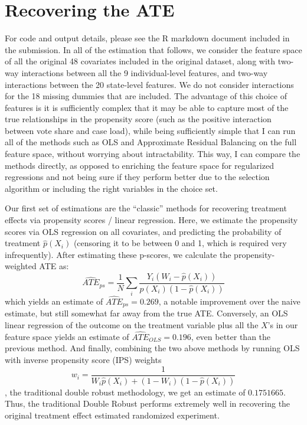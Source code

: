 \documentclass{article}
\begin{document}
\section{Recovering the ATE}
For code and output details, please see the R markdown document included in the submission. In all of the estimation that follows, we consider the feature space of all the original 48 covariates included in the original dataset, along with two-way interactions between all the 9 individual-level features, and two-way interactions between the 20 state-level features. We do not consider interactions for the 18 missing dummies that are included. The advantage of this choice of features is it is sufficiently complex that it may be able to capture most of the true relationships in the propensity score (such as the positive interaction between vote share and case load), while being sufficiently simple that I can run all of the  methods such as OLS and Approximate Residual Balancing on the full feature space, without worrying about intractability. This way, I can compare the methods directly, as opposed to enriching the feature space for regularized regressions and not being sure if they perform better due to the selection algorithm or including the right variables in the choice set.

Our first set of estimations are the ``classic'' methods for recovering treatment effects via propensity scores / linear regression. Here, we estimate the propensity scores via OLS regression on all covariates, and predicting the probability of treatment $\hat p(X_i)$ (censoring it to be between 0 and 1, which is required very infrequently). After estimating these p-scores, we calculate the propensity-weighted ATE as: 
\[\widehat{ATE}_{ps} = \frac{1}{N}\sum_i \frac{ Y_i(W_i-\hat p(X_i))}{\hat p(X_i)(1-\hat p(X_i)) }\]
which yields an estimate of $\widehat{ATE}_{ps}=0.269$, a notable improvement over the naive estimate, but still somewhat far away from the true ATE. Conversely, an OLS linear regression of the outcome on the treatment variable plus all the $X$'s in our feature  space yields an estimate of $\widehat{ATE}_{OLS}=0.196$, even better than the previous method. And finally, combining the two above methods  by running OLS with inverse propensity score (IPS) weights \[w_i = \frac{1}{W_i\hat p(X_i) + (1-W_i)(1-\hat p(X_i))}\], the traditional double robust methodology, we get an estimate of $0.1751665$. Thus, the traditional Double Robust  performs extremely well in recovering the original treatment effect estimated randomized experiment.
\end{document}
